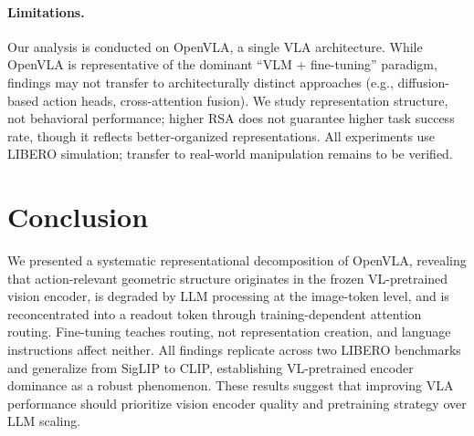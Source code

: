 \documentclass[letterpaper]{article}
\begin{document}
\paragraph{Limitations.}
Our analysis is conducted on OpenVLA, a single VLA architecture. While OpenVLA is representative of the dominant ``VLM + fine-tuning'' paradigm, findings may not transfer to architecturally distinct approaches (e.g., diffusion-based action heads, cross-attention fusion).
We study representation structure, not behavioral performance; higher RSA does not guarantee higher task success rate, though it reflects better-organized representations.
All experiments use LIBERO simulation; transfer to real-world manipulation remains to be verified.

\section{Conclusion}
\label{sec:conclusion}

We presented a systematic representational decomposition of OpenVLA, revealing that action-relevant geometric structure originates in the frozen VL-pretrained vision encoder, is degraded by LLM processing at the image-token level, and is reconcentrated into a readout token through training-dependent attention routing.
Fine-tuning teaches routing, not representation creation, and language instructions affect neither.
All findings replicate across two LIBERO benchmarks and generalize from SigLIP to CLIP, establishing VL-pretrained encoder dominance as a robust phenomenon.
These results suggest that improving VLA performance should prioritize vision encoder quality and pretraining strategy over LLM scaling.


\end{document}

